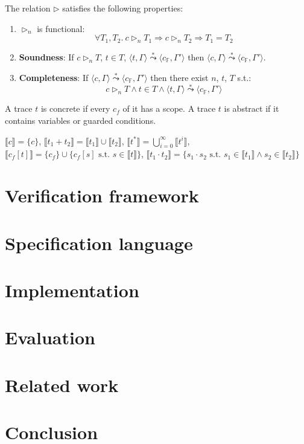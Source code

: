 \documentclass[runningheads]{llncs}
\newcommand{\conf}[1]{\langle #1 \rangle}
\newcommand{\eval}[1]{\llbracket #1 \rrbracket}
\newcommand{\cstate}{\mathtt{\Gamma}}
\begin{document}
\begin{proposition}
	The relation $\triangleright$ satisfies the following properties:
	\begin{enumerate}
		\item $\triangleright_n$ is functional:
		$$
		\forall T_1,T_2.~c \triangleright_n T_1 \Rightarrow c \triangleright_n T_2 \Rightarrow T_1 = T_2
		$$
		\item \textbf{Soundness}: If $c \triangleright_n T$, $t \in T$, $\conf{t,\cstate} \stackrel{*}{\leadsto} \conf{c_{\mathbb{F}},\cstate'}$ then $\conf{c,\cstate} \stackrel{*}{\leadsto} \conf{c_{\mathbb{F}},\cstate'}$.
		\item \textbf{Completeness}: If $\conf{c,\cstate} \stackrel{*}{\leadsto} \conf{c_{\mathbb{F}},\cstate'}$ then there exist $n$, $t$, $T$ s.t.:
		$$c \triangleright_n T \wedge t \in T \wedge \conf{t,\cstate} \stackrel{*}{\leadsto} \conf{c_{\mathbb{F}},\cstate'}$$
	\end{enumerate}
	\end{proposition}
\begin{definition}
	A trace $t$ is concrete if every $c_f$ of it has a scope. A trace $t$ is abstract if it contains variables or guarded conditions.
	\end{definition}

\begin{definition}
	$\eval{c} = \{c\}$, $\eval{t_1+t_2} = \eval{t_1} \cup \eval{t_2}$, $\eval{t^*} = \bigcup_{i=0}^\infty \eval{t^i}$, $\eval{c_f[t]} = \{c_f\} \cup \{c_f[s] \textrm{ s.t. } s \in \eval{t}\}$, $\eval{t_1 \cdot t_2} = \{s_1 \cdot s_2 \textrm{ s.t. } s_1 \in \eval{t_1} \wedge s_2 \in \eval{t_2}\}$ 
	\end{definition}

\section{Verification framework}



\section{Specification language}




\section{Implementation}

\section{Evaluation}

\section{Related work}

\section{Conclusion}
\end{document}
